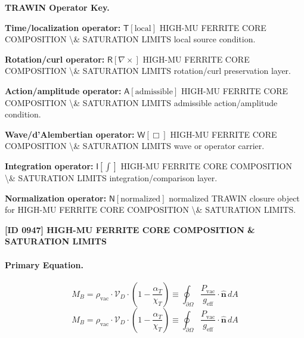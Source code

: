 \par\vspace{0.45\baselineskip}
\noindent\begin{minipage}[t]{\linewidth}
\begingroup
\small
\raggedright
\textbf{TRAWIN Operator Key.}\par
\noindent\textbf{Time/localization operator:} $\mathsf{T}\!\left[\mathrm{local}\right]$ HIGH-MU FERRITE CORE COMPOSITION \textbackslash{}\& SATURATION LIMITS local source condition.\par
\noindent\textbf{Rotation/curl operator:} $\mathsf{R}\!\left[\nabla\times\right]$ HIGH-MU FERRITE CORE COMPOSITION \textbackslash{}\& SATURATION LIMITS rotation/curl preservation layer.\par
\noindent\textbf{Action/amplitude operator:} $\mathsf{A}\!\left[\mathrm{admissible}\right]$ HIGH-MU FERRITE CORE COMPOSITION \textbackslash{}\& SATURATION LIMITS admissible action/amplitude condition.\par
\noindent\textbf{Wave/d'Alembertian operator:} $\mathsf{W}\!\left[\Box\right]$ HIGH-MU FERRITE CORE COMPOSITION \textbackslash{}\& SATURATION LIMITS wave or operator carrier.\par
\noindent\textbf{Integration operator:} $\mathsf{I}\!\left[\int\right]$ HIGH-MU FERRITE CORE COMPOSITION \textbackslash{}\& SATURATION LIMITS integration/comparison layer.\par
\noindent\textbf{Normalization operator:} $\mathsf{N}\!\left[\mathrm{normalized}\right]$ normalized TRAWIN closure object for HIGH-MU FERRITE CORE COMPOSITION \textbackslash{}\& SATURATION LIMITS.\par
\endgroup
\end{minipage}

\clearpage
\noindent\textbf{[ID 0947] HIGH-MU FERRITE CORE COMPOSITION \& SATURATION LIMITS}\par
\vspace{0.35em}
\paragraph{Primary Equation.}
\[
M_B = \rho_{\text{vac}} \cdot \mathcal{V}_D \cdot \left( 1 - \frac{\alpha_T}{\chi_T} \right) \equiv \oint_{\partial \Omega} \frac{P_{\text{vac}}}{g_{\text{eff}}} \cdot \hat{\mathbf{n}} \, dA
\]
\[
M_B = \rho_{\text{vac}} \cdot \mathcal{V}_D \cdot \left( 1 - \frac{\alpha_T}{\chi_T} \right) \equiv \oint_{\partial \Omega} \frac{P_{\text{vac}}}{g_{\text{eff}}} \cdot \hat{\mathbf{n}} \, dA
\]

